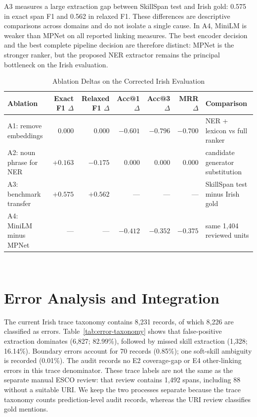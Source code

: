 \documentclass[conference]{IEEEtran}
\begin{document}
A3 measures a large extraction gap between SkillSpan test and Irish gold: 0.575 in exact span F1 and 0.562 in relaxed F1. These differences are descriptive comparisons across domains and do not isolate a single cause. In A4, MiniLM is weaker than MPNet on all reported linking measures. The best encoder decision and the best complete pipeline decision are therefore distinct: MPNet is the stronger ranker, but the proposed NER extractor remains the principal bottleneck on the Irish evaluation.

\begin{table}[!t]
\caption{Ablation Deltas on the Corrected Irish Evaluation}
\label{tab:ablations}
\centering
\small
\begin{tabular}{lrrrrrl}
\toprule
Ablation & Exact F1 $\Delta$ & Relaxed F1 $\Delta$ & Acc@1 $\Delta$ & Acc@3 $\Delta$ & MRR $\Delta$ & Comparison \\
\midrule
A1: remove embeddings & 0.000 & 0.000 & $-0.601$ & $-0.796$ & $-0.700$ & NER + lexicon vs full ranker \\
A2: noun phrase for NER & $+0.163$ & $-0.175$ & 0.000 & 0.000 & 0.000 & candidate generator substitution \\
A3: benchmark transfer & $+0.575$ & $+0.562$ & --- & --- & --- & SkillSpan test minus Irish gold \\
A4: MiniLM minus MPNet & --- & --- & $-0.412$ & $-0.352$ & $-0.375$ & same 1,404 reviewed units \\
\bottomrule
\end{tabular}
\\[1mm]
\par{}
\end{table}

\section{Error Analysis and Integration}
The current Irish trace taxonomy contains 8,231 records, of which 8,226 are classified as errors. Table~\ref{tab:error-taxonomy} shows that false-positive extraction dominates (6,827; 82.99\%), followed by missed skill extraction (1,328; 16.14\%). Boundary errors account for 70 records (0.85\%); one soft-skill ambiguity is recorded (0.01\%). The audit records no E2 coverage-gap or E4 other-linking errors in this trace denominator. These trace labels are not the same as the separate manual ESCO review: that review contains 1,492 spans, including 88 without a suitable URI. We keep the two processes separate because the trace taxonomy counts prediction-level audit records, whereas the URI review classifies gold mentions.
\end{document}
